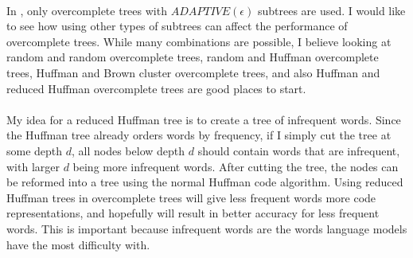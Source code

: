 \paragraph{}
In \cite{MnihHinton2009}, only overcomplete trees with $ADAPTIVE(\epsilon)$ subtrees are used. I would like to see how using other types of subtrees can affect the performance of overcomplete trees. While many combinations are possible, I believe looking at random and random overcomplete trees, random and Huffman overcomplete trees, Huffman and Brown cluster overcomplete trees, and also Huffman and reduced Huffman overcomplete trees are good places to start.
\paragraph{}
My idea for a reduced Huffman tree is to create a tree of infrequent words. Since the Huffman tree already orders words by frequency, if I simply cut the tree at some depth $d$, all nodes below depth $d$ should contain words that are infrequent, with larger $d$ being more infrequent words. After cutting the tree, the nodes can be reformed into a tree using the normal Huffman code algorithm. Using reduced Huffman trees in overcomplete trees will give less frequent words more code representations, and hopefully will result in better accuracy for less frequent words. This is important because infrequent words are the words language models have the most difficulty with.

